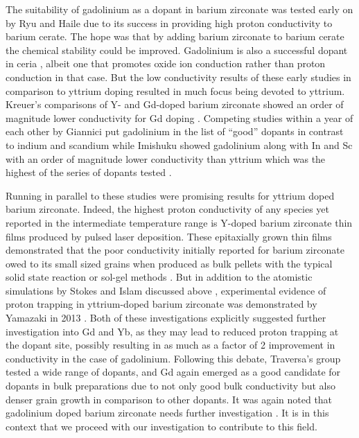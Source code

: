 The suitability of gadolinium as a dopant in barium zirconate was tested early on by Ryu and Haile \cite{Ryu1999} due to its success in providing high proton conductivity to barium cerate. The hope was that by adding barium zirconate to barium cerate the chemical stability could be improved. Gadolinium is also a successful dopant in ceria \cite{Infortuna2008, Steele2001}, albeit one that promotes oxide ion conduction rather than proton conduction in that case. But the low conductivity results of these early studies in comparison to yttrium doping resulted in much focus being devoted to yttrium. Kreuer's comparisons of Y- and Gd-doped barium zirconate showed an order of magnitude lower conductivity for Gd doping \cite{Kreuer2001}. Competing studies within a year of each other by Giannici put gadolinium in the list of ``good'' dopants in contrast to indium and scandium \cite{Giannici2010} while Imishuku showed gadolinium along with In and Sc with an order of magnitude lower conductivity than yttrium which was the highest of the series of dopants tested \cite{Imashuku2009}. 

Running in parallel to these studies were promising results for yttrium doped barium zirconate. Indeed, the highest proton conductivity of any species yet reported in the intermediate temperature range is Y-doped barium zirconate thin films produced by pulsed laser deposition. These epitaxially grown thin films demonstrated that the poor conductivity initially reported for barium zirconate owed to its small sized grains when produced as bulk pellets with the typical solid state reaction or sol-gel methods \cite{Pergolesi2010}. But in addition to the atomistic simulations by Stokes and Islam discussed above \cite{Stokes2010}, experimental evidence of proton trapping in yttrium-doped barium zirconate was demonstrated by Yamazaki in 2013 \cite{Yamazaki2013}. Both of these investigations explicitly suggested further investigation into Gd and Yb, as they may lead to reduced proton trapping at the dopant site, possibly resulting in as much as a factor of 2 improvement in conductivity in the case of gadolinium. Following this debate, Traversa's group tested a wide range of dopants, and Gd again emerged as a good candidate for dopants in bulk preparations due to not only good bulk conductivity but also denser grain growth in comparison to other dopants. It was again noted that gadolinium doped barium zirconate needs further investigation \cite{Gilardi2017}. It is in this context that we proceed with our investigation to contribute to this field.